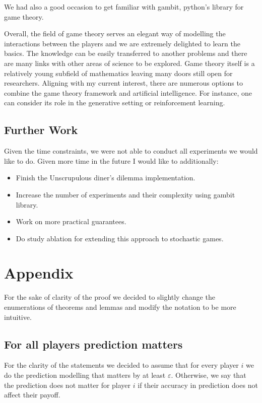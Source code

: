\documentclass[]{spie}  %
\begin{document}
We had also a good occasion to get familiar with gambit, python's library for game theory.

Overall, the field of game theory serves an elegant way of modelling the interactions between the players and we are extremely delighted to learn the basics. The knowledge can be easily transferred to another problems and there are many links with other areas of science to be explored. Game theory itself is a relatively young subfield of mathematics leaving many doors still open for researchers. Aligning with my current interest, there are numerous options to combine the game theory framework and artificial intelligence. For instance, one can consider its role in the generative setting or reinforcement learning.

\subsection{Further Work}
\label{sec:conclusion2}

Given the time constraints, we were not able to conduct all experiments we would like to do. Given more time in the future I would like to additionally:
\begin{itemize}
    \item Finish the Unscrupulous diner's dilemma implementation.
    \item Increase the number of experiments and their complexity using gambit library.
    \item Work on more practical guarantees.
    \item Do study ablation for extending this approach to stochastic games.
\end{itemize}


\newpage
\section{Appendix}
\label{sec:appendix}

For the sake of clarity of the proof we decided to slightly change the enumerations of theorems and lemmas and modify the notation to be more intuitive.

\subsection{For all players prediction matters}
For the clarity of the statements we decided to assume that for every player $i$ we do the prediction modelling that matters by at least $\varepsilon$. Otherwise, we say that the prediction does not matter for player $i$ if their accuracy in prediction does not affect their payoff.
\end{document}
